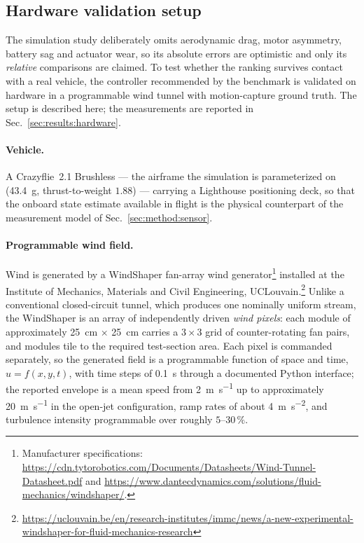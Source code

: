 \subsection{Hardware validation setup}
\label{sec:method:hardware}

The simulation study deliberately omits aerodynamic drag, motor asymmetry, battery sag
and actuator wear, so its absolute errors are optimistic and only its \emph{relative}
comparisons are claimed. To test whether the ranking survives contact with a real
vehicle, the controller recommended by the benchmark is validated on hardware in a
programmable wind tunnel with motion-capture ground truth. The setup is described here;
the measurements are reported in Sec.~\ref{sec:results:hardware}.

\paragraph{Vehicle.}
A Crazyflie~2.1 Brushless --- the airframe the simulation is parameterized on
(\SI{43.4}{\gram}, thrust-to-weight $1.88$) --- carrying a Lighthouse positioning deck,
so that the onboard state estimate available in flight is the physical counterpart of
the measurement model of Sec.~\ref{sec:method:sensor}.

\paragraph{Programmable wind field.}
Wind is generated by a WindShaper fan-array wind
generator\footnote{Manufacturer specifications: \url{https://cdn.tytorobotics.com/Documents/Datasheets/Wind-Tunnel-Datasheet.pdf} and \url{https://www.dantecdynamics.com/solutions/fluid-mechanics/windshaper/}.} installed at the Institute of
Mechanics, Materials and Civil Engineering, UCLouvain.\footnote{\url{https://uclouvain.be/en/research-institutes/immc/news/a-new-experimental-windshaper-for-fluid-mechanics-research}} Unlike
a conventional closed-circuit tunnel, which produces one nominally uniform stream, the
WindShaper is an array of independently driven \emph{wind pixels}: each module of
approximately \SI{25}{\centi\meter} $\times$ \SI{25}{\centi\meter} carries a $3\times3$ grid of counter-rotating fan
pairs, and modules tile to the required test-section area. Each pixel is commanded
separately, so the generated field is a programmable function of space and time,
$u = f(x,y,t)$, with time steps of \SI{0.1}{\second} through a documented Python
interface; the reported envelope is a mean speed from \SI{2}{\meter\per\second} up to
approximately \SI{20}{\meter\per\second} in the open-jet configuration, ramp rates of
about \SI{4}{\meter\per\second\squared}, and turbulence intensity programmable over
roughly $5$--$30\,\%$.

